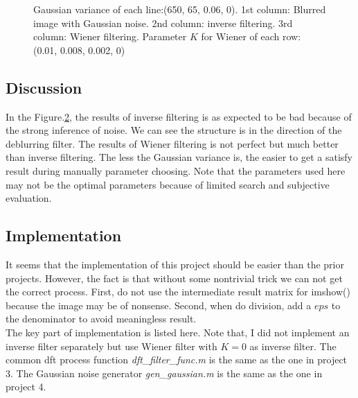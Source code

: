 \begin{figure}[h]
\begin{subfigure}[b]{0.3\linewidth}
		\caption{}
		\label{fig:5_wiener_blur}
	\end{subfigure}
  	\caption{Gaussian variance of each line:(650, 65, 0.06, 0). 1st column: Blurred image with Gaussian noise. 2nd column: inverse filtering. 3rd column: Wiener filtering. Parameter $K$ for Wiener of each row: (0.01, 0.008, 0.002, 0)}
  	\label{fig:5_results}
\end{figure}

\subsection{Discussion}
In the Figure.\ref{fig:5_results}, the results of inverse filtering is as expected to be bad because of the strong inference of noise. We can see the structure is in the direction of the deblurring filter. The results of Wiener filtering is not perfect but much better than inverse filtering. The less the Gaussian variance is, the easier to get a satisfy result during manually parameter choosing. Note that the parameters used here may not be the optimal parameters because of limited search and subjective evaluation. 

\subsection{Implementation}
It seems that the implementation of this project should be easier than the prior projects. However, the fact is that without some nontrivial trick we can not get the correct process. First, do not use the intermediate result matrix for imshow() because the image may be of nonsense. Second, when do division, add a $eps$ to the denominator to avoid meaningless result. \\
The key part of implementation is listed here. Note that, I did not implement an inverse filter separately but use Wiener filter with $K=0$ as inverse filter. The common dft process function \emph{dft\_filter\_func.m} is the same as the one in project 3. The Gaussian noise generator \emph{gen\_gaussian.m} is the same as the one in project 4.


